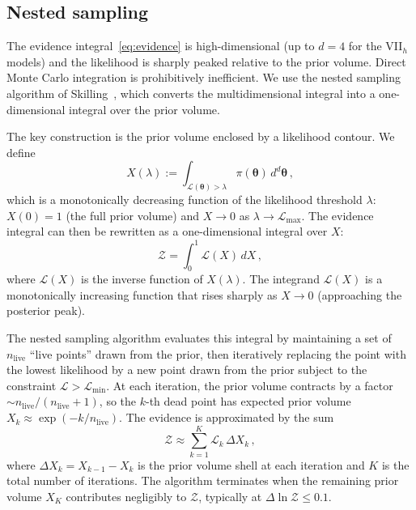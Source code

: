 \subsection{Nested sampling}\label{sec:nested-sampling}

The evidence integral~\eqref{eq:evidence} is high-dimensional
(up to $d = 4$ for the VII$_h$ models) and the likelihood is
sharply peaked relative to the prior volume.  Direct Monte Carlo
integration is prohibitively inefficient.  We use the nested
sampling algorithm of Skilling~\cite{Skilling2004}, which
converts the multidimensional integral into a one-dimensional
integral over the prior volume.

The key construction is the prior volume enclosed by a
likelihood contour.  We define
\begin{equation}\label{eq:prior-volume}
X(\lambda) := \int_{\mathcal{L}(\boldsymbol{\theta})
  > \lambda} \pi(\boldsymbol{\theta})\,
  d^d\boldsymbol{\theta}\,,
\end{equation}
which is a monotonically decreasing function of the likelihood
threshold $\lambda$: $X(0) = 1$ (the full prior volume) and
$X \to 0$ as $\lambda \to \mathcal{L}_{\max}$.  The evidence
integral can then be rewritten as a one-dimensional integral
over $X$:
\begin{equation}\label{eq:evidence-1d}
\mathcal{Z}
= \int_0^1 \mathcal{L}(X)\,dX\,,
\end{equation}
where $\mathcal{L}(X)$ is the inverse function of
$X(\lambda)$.  The integrand $\mathcal{L}(X)$ is a monotonically
increasing function that rises sharply as $X \to 0$
(approaching the posterior peak).

The nested sampling algorithm evaluates this integral by
maintaining a set of $n_{\mathrm{live}}$ ``live points'' drawn
from the prior, then iteratively replacing the point with the
lowest likelihood by a new point drawn from the prior subject
to the constraint $\mathcal{L} > \mathcal{L}_{\min}$.  At each
iteration, the prior volume contracts by a factor
$\sim n_{\mathrm{live}}/(n_{\mathrm{live}} + 1)$, so the
$k$-th dead point has expected prior volume
$X_k \approx \exp(-k/n_{\mathrm{live}})$.  The evidence is
approximated by the sum
\begin{equation}\label{eq:evidence-sum}
\mathcal{Z}
\approx \sum_{k=1}^{K} \mathcal{L}_k\,\Delta X_k\,,
\end{equation}
where $\Delta X_k = X_{k-1} - X_k$ is the prior volume shell
at each iteration and $K$ is the total number of iterations.
The algorithm terminates when the remaining prior volume
$X_K$ contributes negligibly to $\mathcal{Z}$, typically at
$\Delta\ln\mathcal{Z} \leq 0.1$.

